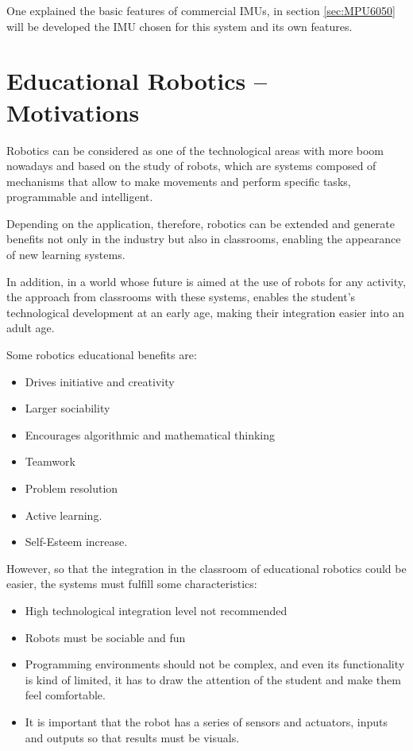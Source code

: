 One explained the basic features of commercial IMUs, in section \ref{sec:MPU6050} will be developed the IMU chosen for this system and its own features.

\section{Educational Robotics – Motivations}

Robotics\cite{6826237} can be considered as one of the technological areas with more boom nowadays and based on the study of robots, which are systems composed of mechanisms that allow to make movements and perform specific tasks, programmable and intelligent. \newline

Depending on the application, therefore, robotics can be extended and generate benefits not only in the industry but also in classrooms, enabling the appearance of new learning systems.\newline

In addition, in a world whose future is aimed at the use of robots for any activity, the approach from classrooms with these systems, enables the student’s technological development at an early age, making their integration easier into an adult age.\newline

Some robotics educational benefits are:  
\begin{itemize}
	\item Drives initiative and creativity
	\item Larger sociability
	\item Encourages algorithmic and mathematical thinking
	\item Teamwork
	\item Problem resolution
	\item Active learning.
	\item Self-Esteem increase.
\end{itemize}

However, so that the integration in the classroom of educational robotics could be easier, the systems must fulfill some characteristics:

\begin{itemize}
	\item High technological integration level not recommended
	\item Robots must be sociable and fun
	\item Programming environments should not be complex, and even its functionality is kind of limited, it has to draw the attention of the student and make them feel comfortable.
	\item It is important that the robot has a series of sensors and actuators, inputs and outputs so that results must be visuals.
\end{itemize}

